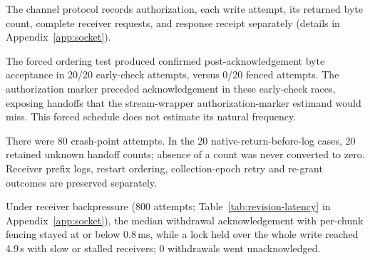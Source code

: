 The channel protocol records authorization, each write attempt, its returned byte count,
complete receiver requests, and response receipt separately (details in Appendix~\ref{app:socket}).

The forced ordering test produced confirmed post-acknowledgement byte acceptance in 20/20 early-check attempts, versus 0/20 fenced attempts. The authorization marker preceded acknowledgement in these early-check races, exposing handoffs that the stream-wrapper authorization-marker estimand would miss. This forced schedule does not estimate its natural frequency.

There were 80 crash-point attempts. In the 20 native-return-before-log cases, 20 retained unknown handoff counts; absence of a count was never converted to zero. Receiver prefix logs, restart ordering, collection-epoch retry and re-grant outcomes are preserved separately.

Under receiver backpressure (800 attempts; Table~\ref{tab:revision-latency} in Appendix~\ref{app:socket}), the median withdrawal acknowledgement with per-chunk fencing stayed at or below 0.8\,ms, while a lock held over the whole write reached 4.9\,s with slow or stalled receivers; 0 withdrawals went unacknowledged.

